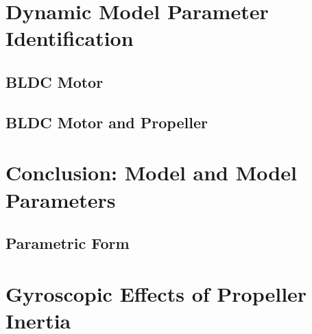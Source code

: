 \documentclass[letterpaper, 11pt]{article}
\begin{document}
\section{Dynamic Model Parameter Identification}
\subsection{BLDC Motor}
\subsection{BLDC Motor and Propeller}
\newpage


\section{Conclusion: Model and Model Parameters}
\subsection{Parametric Form}
\newpage


\section{Gyroscopic Effects of Propeller Inertia}
\newpage
\newpage


\end{document}
